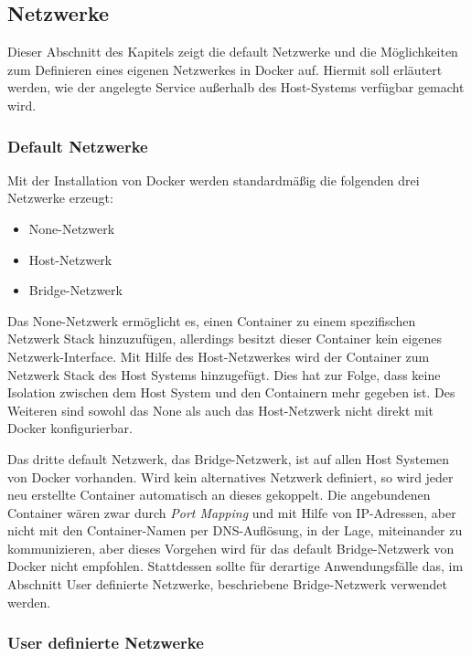 \subsection{Netzwerke}

Dieser Abschnitt des Kapitels zeigt die default Netzwerke und die Möglichkeiten zum Definieren eines eigenen Netzwerkes in Docker auf.
Hiermit soll erläutert werden, wie der angelegte Service außerhalb des Host-Systems verfügbar gemacht wird.

\subsubsection{Default Netzwerke}

Mit der Installation von Docker werden standardmäßig die folgenden drei Netzwerke erzeugt:

\begin{itemize}
	\item None-Netzwerk
	\item Host-Netzwerk
	\item Bridge-Netzwerk
\end{itemize}

Das None-Netzwerk ermöglicht es, einen Container zu einem spezifischen Netzwerk Stack hinzuzufügen, allerdings besitzt dieser Container kein eigenes Netzwerk-Interface. 
Mit Hilfe des Host-Netzwerkes wird der Container zum Netzwerk Stack des Host Systems hinzugefügt.
Dies hat zur Folge, dass keine Isolation zwischen dem Host System und den Containern mehr gegeben ist.
Des Weiteren sind sowohl das None als auch das Host-Netzwerk nicht direkt mit Docker konfigurierbar.

Das dritte default Netzwerk, das Bridge-Netzwerk, ist auf allen Host Systemen von Docker vorhanden.
Wird kein alternatives Netzwerk definiert, so wird jeder neu erstellte Container automatisch an dieses gekoppelt.
Die angebundenen Container wären zwar durch \textit{Port Mapping} und mit Hilfe von IP-Adressen, aber nicht mit den Container-Namen per DNS-Auflösung, in der Lage, miteinander zu kommunizieren, aber dieses Vorgehen wird für das default Bridge-Netzwerk von Docker nicht empfohlen.
Stattdessen sollte für derartige Anwendungsfälle das, im Abschnitt User definierte Netzwerke, beschriebene Bridge-Netzwerk verwendet werden.

\subsubsection{User definierte Netzwerke}

